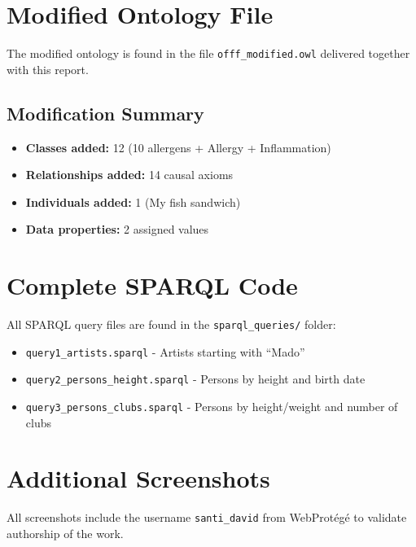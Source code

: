 \documentclass[12pt,a4paper]{article}
\begin{document}
\newpage
\appendix

\section{Modified Ontology File}

The modified ontology is found in the file \texttt{offf\_modified.owl} delivered together with this report.

\subsection{Modification Summary}

\begin{itemize}
    \item \textbf{Classes added:} 12 (10 allergens + Allergy + Inflammation)
    \item \textbf{Relationships added:} 14 causal axioms
    \item \textbf{Individuals added:} 1 (My fish sandwich)
    \item \textbf{Data properties:} 2 assigned values
\end{itemize}

\section{Complete SPARQL Code}

All SPARQL query files are found in the \texttt{sparql\_queries/} folder:

\begin{itemize}
    \item \texttt{query1\_artists.sparql} - Artists starting with ``Mado''
    \item \texttt{query2\_persons\_height.sparql} - Persons by height and birth date
    \item \texttt{query3\_persons\_clubs.sparql} - Persons by height/weight and number of clubs
\end{itemize}

\section{Additional Screenshots}

All screenshots include the username \texttt{santi\_david} from WebProtégé to validate authorship of the work.
\end{document}
